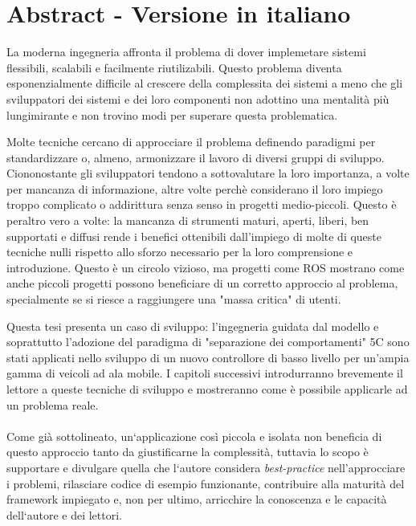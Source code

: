 

\begingroup
\let\clearpage\relax
\let\cleardoublepage\relax
\let\cleardoublepage\relax

\chapter*{Abstract - Versione in italiano}
La moderna ingegneria affronta il problema di dover implemetare sistemi flessibili, scalabili e facilmente riutilizabili. Questo problema diventa esponenzialmente difficile al crescere della complessita dei sistemi a meno che gli sviluppatori dei sistemi e dei loro componenti non adottino una mentalità più lungimirante e non trovino modi per superare questa problematica.

Molte tecniche cercano di approcciare il problema definendo paradigmi per standardizzare o, almeno, armonizzare il lavoro di diversi gruppi di sviluppo. Ciononostante gli sviluppatori tendono a sottovalutare la loro importanza, a volte per mancanza di informazione, altre volte perchè considerano il loro impiego troppo complicato o addirittura senza senso in progetti medio-piccoli. Questo è peraltro vero a volte: la mancanza di strumenti maturi, aperti, liberi, ben supportati e diffusi rende i benefici ottenibili dall'impiego di molte di queste tecniche nulli rispetto allo sforzo necessario per la loro comprensione e introduzione. Questo è un circolo vizioso, ma progetti come ROS
mostrano come anche piccoli progetti possono beneficiare di un corretto approccio al problema, specialmente se si riesce a raggiungere una "massa critica" di utenti.

Questa tesi presenta un caso di sviluppo: l'ingegneria guidata dal modello e soprattutto l'adozione del paradigma di "separazione dei comportamenti" 5C sono stati applicati nello sviluppo di un nuovo controllore di basso livello per un'ampia gamma di veicoli ad ala mobile. I capitoli successivi introdurranno brevemente il lettore a queste tecniche di sviluppo e mostreranno come è possibile applicarle ad un problema reale.
\\
\\
Come già sottolineato, un`applicazione così piccola e isolata non beneficia di questo approccio tanto da giustificarne la complessità, tuttavia lo scopo è supportare e divulgare quella che l`autore considera \emph{best-practice} nell'approcciare i problemi, rilasciare codice di esempio funzionante, contribuire alla maturità del framework impiegato e, non per ultimo, arricchire la conoscenza e le capacità dell`autore e dei lettori.

\endgroup			

\vfill
